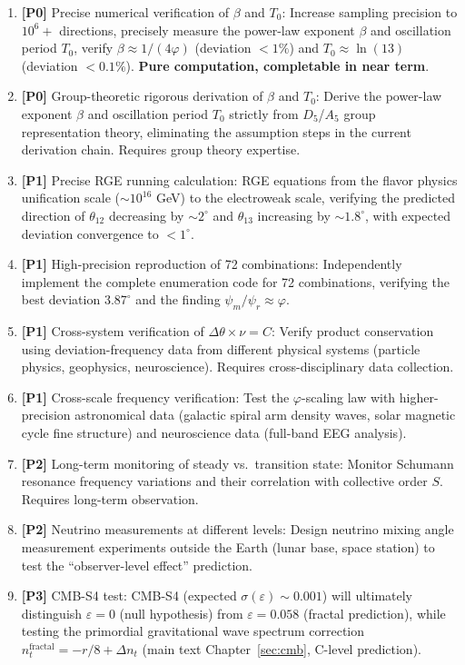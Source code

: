 \documentclass[12pt,a4paper,twocolumn]{article}
\renewcommand{\phi}{\varphi}
\begin{document}
\begin{enumerate}
\item \textbf{[P0]} Precise numerical verification of $\beta$ and $T_0$: Increase sampling precision to $10^6+$ directions, precisely measure the power-law exponent $\beta$ and oscillation period $T_0$, verify $\beta \approx 1/(4\phi)$ (deviation $<1\%$) and $T_0 \approx \ln(13)$ (deviation $<0.1\%$). \textbf{Pure computation, completable in near term}.

\item \textbf{[P0]} Group-theoretic rigorous derivation of $\beta$ and $T_0$: Derive the power-law exponent $\beta$ and oscillation period $T_0$ strictly from $D_5$/$A_5$ group representation theory, eliminating the assumption steps in the current derivation chain. Requires group theory expertise.

\item \textbf{[P1]} Precise RGE running calculation: RGE equations from the flavor physics unification scale ($\sim 10^{16}$ GeV) to the electroweak scale, verifying the predicted direction of $\theta_{12}$ decreasing by $\sim 2^\circ$ and $\theta_{13}$ increasing by $\sim 1.8^\circ$, with expected deviation convergence to $<1^\circ$.

\item \textbf{[P1]} High-precision reproduction of 72 combinations: Independently implement the complete enumeration code for 72 combinations, verifying the best deviation $3.87^\circ$ and the finding $\psi_m/\psi_r \approx \phi$.

\item \textbf{[P1]} Cross-system verification of $\Delta\theta \times \nu = C$: Verify product conservation using deviation-frequency data from different physical systems (particle physics, geophysics, neuroscience). Requires cross-disciplinary data collection.

\item \textbf{[P1]} Cross-scale frequency verification: Test the $\phi$-scaling law with higher-precision astronomical data (galactic spiral arm density waves, solar magnetic cycle fine structure) and neuroscience data (full-band EEG analysis).

\item \textbf{[P2]} Long-term monitoring of steady vs.\ transition state: Monitor Schumann resonance frequency variations and their correlation with collective order $S$. Requires long-term observation.

\item \textbf{[P2]} Neutrino measurements at different levels: Design neutrino mixing angle measurement experiments outside the Earth (lunar base, space station) to test the ``observer-level effect'' prediction.

\item \textbf{[P3]} CMB-S4 test: CMB-S4 (expected $\sigma(\varepsilon) \sim 0.001$) will ultimately distinguish $\varepsilon = 0$ (null hypothesis) from $\varepsilon = 0.058$ (fractal prediction), while testing the primordial gravitational wave spectrum correction $n_t^{\text{fractal}} = -r/8 + \Delta n_t$ (main text Chapter~\ref{sec:cmb}, C-level prediction).
\end{enumerate}
\end{document}
